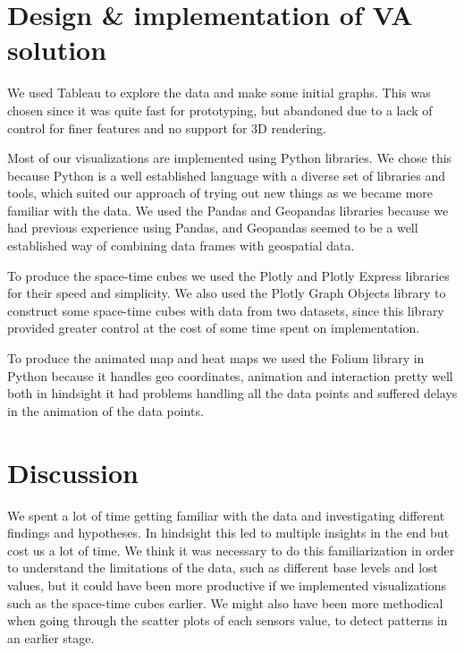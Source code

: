 \documentclass[journal]{vgtc}                %
\begin{document}
\section{Design \& implementation of VA solution}

We used Tableau\cite{Tableau} to explore the data and make some initial graphs. This was chosen since it was quite fast for prototyping, but abandoned due to a lack of control for finer features and no support for 3D rendering. 

Most of our visualizations are implemented using Python libraries. We chose this because Python is a well established language with a diverse set of libraries and tools, which suited our approach of trying out new things as we became more familiar with the data. We used the Pandas and Geopandas libraries because we had previous experience using Pandas, and Geopandas seemed to be a well established way of combining data frames with geospatial data. 

To produce the space-time cubes\cite{Spacetime} we used the Plotly and Plotly Express libraries for their speed and simplicity. We also used the Plotly Graph Objects library to construct some space-time cubes with data from two datasets, since this library provided greater control at the cost of some time spent on implementation. 

To produce the animated map and heat maps we used the Folium library in Python because it handles geo coordinates, animation and interaction pretty well both in hindsight it had problems handling all the data points and suffered delays in the animation of the data points. 




\section{Discussion}

We spent a lot of time getting familiar with the data and investigating different findings and hypotheses. In hindsight this led to multiple insights in the end but cost us a lot of time. We think it was necessary to do this familiarization in order to understand the limitations of the data, such as different base levels and lost values, but it could have been more productive if we implemented visualizations such as the space-time cubes earlier. We might also have been more methodical when going through the scatter plots of each sensors value, to detect patterns in an earlier stage. 
\end{document}
